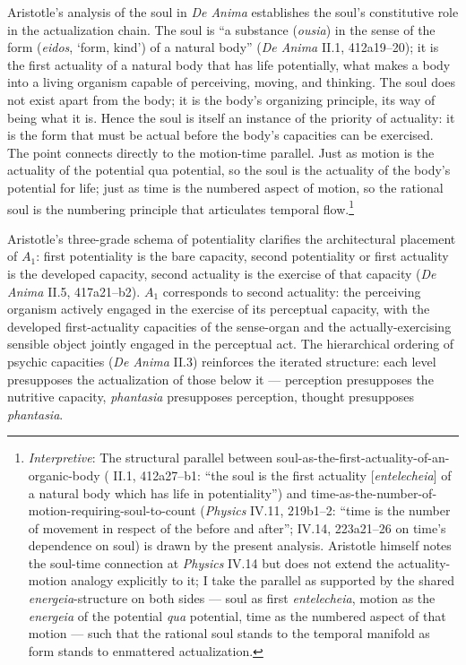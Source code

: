 Aristotle's analysis of the soul in \textit{De Anima} establishes the soul's constitutive role in the actualization chain. The soul is ``a substance (\textit{ousia}) in the sense of the form (\textit{eidos},  `form, kind') of a natural body'' (\textit{De Anima} II.1, 412a19--20); it is the first actuality of a natural body that has life potentially, what makes a body into a living organism capable of perceiving, moving, and thinking. The soul does not exist apart from the body; it is the body's organizing principle, its way of being what it is. Hence the soul is itself an instance of the priority of actuality: it is the form that must be actual before the body's capacities can be exercised. The point connects directly to the motion-time parallel. Just as motion is the actuality of the potential qua potential, so the soul is the actuality of the body's potential for life; just as time is the numbered aspect of motion, so the rational soul is the numbering principle that articulates temporal flow.\footnote{\textit{Interpretive}: The structural parallel between soul-as-the-first-actuality-of-an-organic-body (\cite{aristotle2014soul} II.1, 412a27--b1: ``the soul is the first actuality [\textit{entelecheia}] of a natural body which has life in potentiality'') and time-as-the-number-of-motion-requiring-soul-to-count (\textit{Physics} IV.11, 219b1--2: ``time is the number of movement in respect of the before and after''; IV.14, 223a21--26 on time's dependence on soul) is drawn by the present analysis. Aristotle himself notes the soul-time connection at \textit{Physics} IV.14 but does not extend the actuality-motion analogy explicitly to it; I take the parallel as supported by the shared \textit{energeia}-structure on both sides --- soul as first \textit{entelecheia}, motion as the \textit{energeia} of the potential \textit{qua} potential, time as the numbered aspect of that motion --- such that the rational soul stands to the temporal manifold as form stands to enmattered actualization.}

Aristotle's three-grade schema of potentiality clarifies the architectural placement of $A_1$: first potentiality is the bare capacity, second potentiality or first actuality is the developed capacity, second actuality is the exercise of that capacity (\textit{De Anima} II.5, 417a21--b2). $A_1$ corresponds to second actuality: the perceiving organism actively engaged in the exercise of its perceptual capacity, with the developed first-actuality capacities of the sense-organ and the actually-exercising sensible object jointly engaged in the perceptual act. The hierarchical ordering of psychic capacities (\textit{De Anima} II.3) reinforces the iterated structure: each level presupposes the actualization of those below it --- perception presupposes the nutritive capacity, \textit{phantasia} presupposes perception, thought presupposes \textit{phantasia}.

